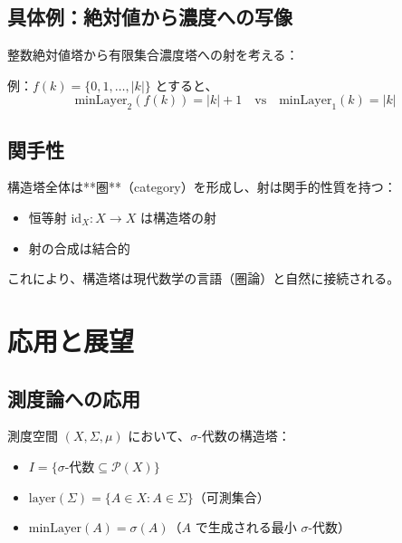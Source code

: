 \documentclass[a4paper,11pt]{ltjsarticle}
\begin{document}
\subsection{具体例：絶対値から濃度への写像}

整数絶対値塔から有限集合濃度塔への射を考える：

\begin{center}
\end{center}

例：$f(k) = \{0, 1, \ldots, |k|\}$ とすると、
\[
\text{minLayer}_2(f(k)) = |k| + 1 \quad \text{vs} \quad \text{minLayer}_1(k) = |k|
\]

\subsection{関手性}

構造塔全体は**圏**（category）を形成し、射は関手的性質を持つ：
\begin{itemize}
\item 恒等射 $\text{id}_X : X \to X$ は構造塔の射
\item 射の合成は結合的
\end{itemize}

これにより、構造塔は現代数学の言語（圏論）と自然に接続される。

\newpage

\section{応用と展望}

\subsection{測度論への応用}

測度空間 $(X, \Sigma, \mu)$ において、$\sigma$-代数の構造塔：
\begin{itemize}
\item $I = \{\text{$\sigma$-代数} \subseteq \mathcal{P}(X)\}$
\item $\text{layer}(\Sigma) = \{A \in X : A \in \Sigma\}$（可測集合）
\item $\text{minLayer}(A) = \sigma(A)$（$A$ で生成される最小 $\sigma$-代数）
\end{itemize}
\end{document}
